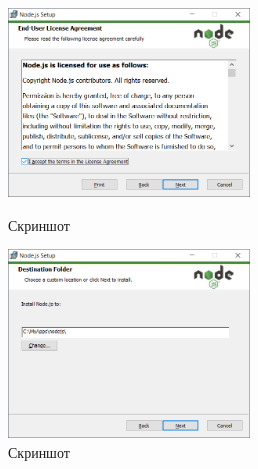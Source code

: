 \begin{figure}[!phtb]
    \centering

    \begin{minipage}{0.49\textwidth}
        \centering

        \includegraphics[height=5cm]
        {images/install/node-js/3.png}

        \caption{Скриншот}

        \label{fig:nodejs_3}
    \end{minipage}
    \begin{minipage}{0.49\textwidth}
        \centering

        \includegraphics[height=5cm]
        {images/install/node-js/4.png}

        \caption{Скриншот}

        \label{fig:nodejs_4}
    \end{minipage}
\end{figure}

